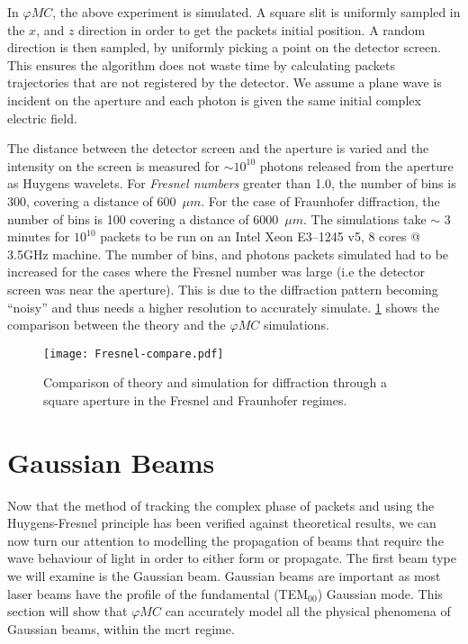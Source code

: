 \medskip

In $\varphi MC$, the above experiment is simulated. 
A square slit is uniformly sampled in the $x$, and $z$ direction in order to get the packets initial position. 
A random direction is then sampled, by uniformly picking a point on the detector screen.
This ensures the algorithm does not waste time by calculating packets trajectories that are not registered by the detector.
We assume a plane wave is incident on the aperture and each photon is given the same initial complex electric field.

The distance between the detector screen and the aperture is varied and the intensity on the screen is measured for $\sim 10^{10}$ photons released from the aperture as Huygens wavelets.
For \textit{Fresnel numbers} greater than 1.0, the number of bins is 300, covering a distance of 600~$\mu m$. 
For the case of Fraunhofer diffraction, the number of bins is 100 covering a distance of 6000~$\mu m$.
The simulations take $\sim$ 3 minutes for $10^{10}$ packets to be run on an Intel Xeon E3--1245 v5, 8 cores @ 3.5GHz machine.
The number of bins, and photons packets simulated had to be increased for the cases where the Fresnel number was large (i.e the detector screen was near the aperture).
This is due to the diffraction pattern becoming ``noisy'' and thus needs a higher resolution to accurately simulate.
\cref{fig:frescompare} shows the comparison between the theory and the $\varphi MC$ simulations.

\begin{figure}[!ht]
    \centering
    \texttt{[image: Fresnel-compare.pdf]}
    \caption{Comparison of theory and simulation for diffraction through a square aperture in the Fresnel and Fraunhofer regimes.}
    \label{fig:frescompare}
\end{figure}

\FloatBarrier
\newpage
\section{Gaussian Beams}

Now that the method of tracking the complex phase of packets and using the Huygens-Fresnel principle has been verified against theoretical results, we can now turn our attention to modelling the propagation of beams that require the wave behaviour of light in order to either form or propagate.
The first beam type we will examine is the Gaussian beam.
Gaussian beams are important as most laser beams have the profile of the fundamental (TEM$_{00}$) Gaussian mode.
This section will show that $\varphi MC$ can accurately model all the physical phenomena of Gaussian beams, within the \gls*{mcrt} regime.

